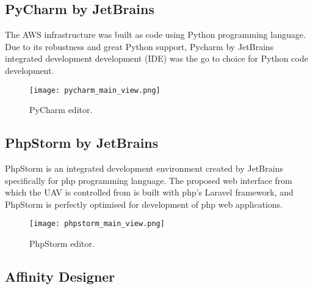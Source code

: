 
\subsection{PyCharm by JetBrains}
\label{subsec:pycharm}

The AWS infrastructure was built as code using Python programming language. Due to its robustness and great Python support, Pycharm by JetBrains integrated development development (IDE) was the go to choice for Python code development.

\begin{figure}[H]
    \centering \texttt{[image: pycharm\_main\_view.png]}
    \caption{PyCharm editor.}
    \label{fig:pycharm}
\end{figure}




\subsection{PhpStorm by JetBrains}
\label{subsec:phpstorm}

PhpStorm is an integrated development environment created by JetBrains specifically for php programming language. The proposed web interface from which the UAV is controlled from is built with php's Laravel framework, and PhpStorm is perfectly optimised for development of php web applications.

\begin{figure}[H]
    \centering \texttt{[image: phpstorm\_main\_view.png]}
    \caption{PhpStorm editor.}
    \label{fig:phpstorm}
\end{figure}




\subsection{Affinity Designer}
\label{subsec:affinity-designer}

